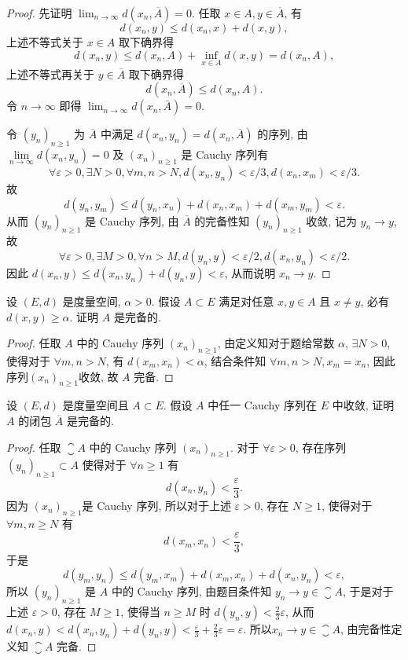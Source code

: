\begin{proof}
    先证明 $\lim_{n\to\infty}d(x_n,\overline{A})=0$. 任取 $x\in A,y\in\overline{A}$, 有
    \begin{equation*}
        d(x_n,y)\leq d(x_n,x)+d(x,y),
    \end{equation*}
    上述不等式关于 $x\in A$ 取下确界得
    \[d(x_n,y)\leq d(x_n,A)+\inf_{x\in A}d(x,y)=d(x_n,A),\]
    上述不等式再关于 $y\in\overline{A}$ 取下确界得
    \[d(x_n,\overline{A})\leq d(x_n,A).\]
    令 $n\to\infty$ 即得 $\lim_{n\to\infty}d(x_n,\bar{A})=0$.

    令 $(y_n)_{n\geq 1}$ 为 $\overline{A}$ 中满足 $d(x_n,y_n)=d(x_n,\overline{A})$ 的序列, 
    由 $\lim\limits_{n\to\infty}d(x_n,y_n)=0$ 及 $(x_n)_{n\geq 1}$ 是 Cauchy 序列有
    \[\forall\varepsilon>0,\exists N>0,\forall m,n>N,d(x_n,y_n)<\varepsilon/3,d(x_n,x_m)<\varepsilon/3.\]
    故
    \[d(y_n,y_m)\leq d(y_n,x_n)+d(x_n,x_m)+d(x_m,y_m)<\varepsilon.\]
    从而 $(y_n)_{n\geq 1}$ 是 Cauchy 序列, 由 $\overline{A}$ 的完备性知 $(y_n)_{n\geq 1}$ 收敛, 记为 $y_n\to y$, 故
    \[\forall\varepsilon>0,\exists M>0,\forall n>M,d(y_n,y)<\varepsilon/2,d(x_n,y_n)<\varepsilon/2.\]
    因此 $d(x_n,y)\leq d(x_n,y_n)+d(y_n,y)<\varepsilon$, 从而说明 $x_n\to y$.
\end{proof}


\begin{exercise}
    设 $(E,d)$ 是度量空间, $\alpha>0$. 假设 $A\subset E$ 满足对任意 $x,y\in A$
    且 $x\neq y$, 必有 $d(x,y)\geq\alpha$. 证明 $A$ 是完备的.
\end{exercise}

\begin{proof}
    任取 $A$ 中的 Cauchy 序列 $(x_n)_{n\geq 1}$, 由定义知对于题给常数 $\alpha$, 
    $\exists N>0$, 使得对于 $\forall m,n>N$, 有 $d(x_m,x_n)<\alpha$, 结合条件知
    $\forall m,n>N,x_m=x_n$, 因此序列$(x_n)_{n\geq 1}$收敛, 故 $A$ 完备.
\end{proof}


\begin{exercise}
    设 $(E,d)$ 是度量空间且 $A\subset E$. 假设 $A$ 中任一 Cauchy 序列在 $E$ 中收敛,
    证明 $A$ 的闭包 $\overline{A}$ 是完备的.
\end{exercise}

\begin{proof}
    任取 $\closure{A}$ 中的 Cauchy 序列 $(x_n)_{n\geq 1}$.
    对于 $\forall\varepsilon>0$, 存在序列 $(y_n)_{n\geq 1}\subset A$ 使得对于 $\forall n\geq 1$ 有
    \[d(x_n,y_n)<\frac{\varepsilon}{3}.\]
    因为 $(x_n)_{n\geq 1}$是 Cauchy 序列, 所以对于上述 $\varepsilon>0$,
    存在 $N\geq 1$, 使得对于 $\forall m,n\geq N$ 有
    \[d(x_m,x_n)<\frac{\varepsilon}{3},\]
    于是
    \[d(y_m,y_n)\leq d(y_m,x_m)+d(x_m,x_n)+d(x_n,y_n)<\varepsilon,\]
    所以 $(y_n)_{n\geq 1}$ 是 $A$ 中的 Cauchy 序列, 由题目条件知 $y_n\to y\in\closure{A}$,
    于是对于上述 $\varepsilon>0$, 存在 $M\geq 1$, 使得当 $n\geq M$ 时 $d(y_n,y)<\frac{2}{3}\varepsilon$,
    从而 $d(x_n,y)<d(x_n,y_n)+d(y_n,y)<\frac{\varepsilon}{3}+\frac{2}{3}\varepsilon=\varepsilon$.
    所以$x_n\to y\in\closure{A}$, 由完备性定义知 $\closure{A}$ 完备.
\end{proof}


